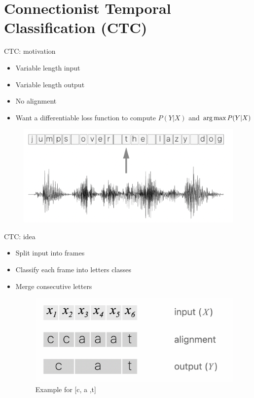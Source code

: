 \section{Connectionist Temporal Classification (CTC)}
\begin{frame}{CTC: motivation}
\begin{itemize}
    \item Variable length input
    \item Variable length output
    \item No alignment
    \item Want a differentiable loss function to compute $P(Y | X)$ and $\operatorname*{arg\,max}{P(Y | X)}$

\end{itemize}

    \begin{figure}
    	\centering
    	\includegraphics[width=0.8\linewidth]{figs/ctc_motivation.png}
    \end{figure}
    
\end{frame}

\begin{frame}{CTC: idea}
\begin{itemize}
    \item Split input into frames
    \item Classify each frame into letters classes
    \item Merge consecutive letters
    
    \begin{figure}
    	\centering
    	\includegraphics[width=0.8\linewidth]{figs/ctc_idea.png}
    	\caption{Example for [c, a ,t]}

    \end{figure}
\end{itemize}
\end{frame}

